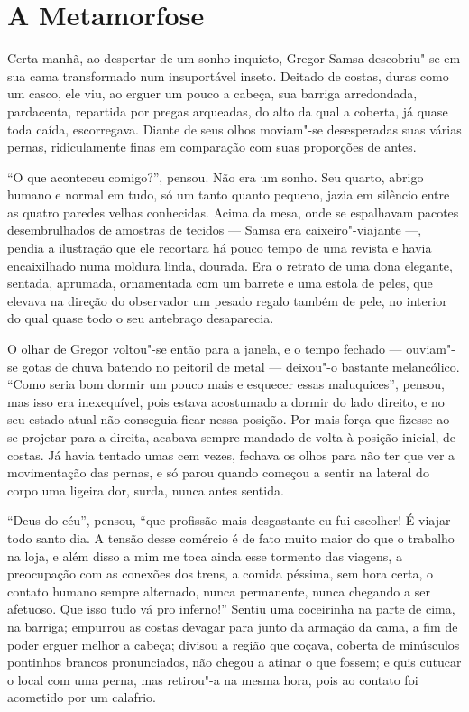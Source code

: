 \movetooddpage
{}
\part*{A Metamorfose}

\sectionitem

Certa manhã, ao despertar de um sonho inquieto, Gregor Samsa descobriu"-se
em sua cama transformado num insuportável inseto. Deitado de costas, duras
como um casco, ele viu, ao erguer um pouco a cabeça, sua barriga arredondada,
pardacenta, repartida por pregas arqueadas, do alto da qual a coberta, já
quase toda caída, escorregava. Diante de seus olhos moviam"-se
desesperadas suas várias pernas, ridiculamente finas em comparação com
suas proporções de antes.

“O que aconteceu comigo?”, pensou. Não era um sonho. Seu quarto, abrigo
humano e normal em tudo, só um tanto quanto pequeno, jazia em silêncio
entre as quatro paredes velhas conhecidas. Acima da mesa, onde se
espalhavam pacotes desembrulhados de amostras de tecidos --- Samsa era
caixeiro"-viajante ---, pendia a ilustração que ele recortara há pouco tempo
de uma revista e havia encaixilhado numa moldura linda, dourada. Era o
retrato de uma dona elegante, sentada, aprumada, ornamentada com um
barrete e uma estola de peles, que elevava na direção do observador um
pesado regalo também de pele, no interior do qual quase todo o seu
antebraço desaparecia.

O olhar de Gregor voltou"-se então para a janela, e o tempo fechado ---
ouviam"-se gotas de chuva batendo no peitoril de metal --- deixou"-o bastante
melancólico. “Como seria bom dormir um pouco mais e esquecer
essas maluquices”, pensou, mas isso era inexequível, pois estava
acostumado a dormir do lado direito, e no seu estado atual não conseguia
ficar nessa posição. Por mais força que fizesse ao se projetar para a
direita, acabava sempre mandado de volta à posição inicial, de costas. Já
havia tentado umas cem vezes, fechava os olhos para não ter que ver a
movimentação das pernas, e só parou quando começou a sentir na
lateral do corpo uma
ligeira dor, surda, nunca antes sentida.

“Deus do céu”, pensou, “que profissão mais desgastante eu fui escolher! É
viajar todo santo dia. A tensão desse comércio é de fato muito maior do
que o trabalho na loja, e além disso a mim me toca ainda esse tormento das
viagens, a preocupação com as conexões dos trens, a comida péssima, sem
hora certa, o contato humano sempre alternado, nunca permanente, nunca
chegando a ser afetuoso. Que isso tudo vá pro inferno!” Sentiu uma
coceirinha na parte de cima, na barriga; empurrou as costas devagar para
junto da armação da cama, a fim de poder erguer melhor a cabeça; divisou a
região que coçava, coberta de minúsculos pontinhos brancos pronunciados,
não chegou a atinar o que fossem; e quis cutucar o local com uma perna,
mas retirou"-a na mesma hora, pois ao contato foi acometido por um
calafrio.

